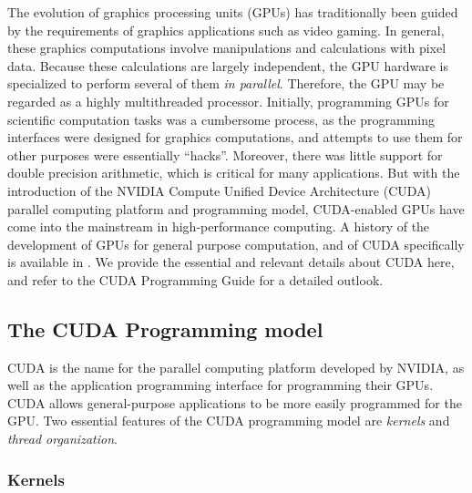 The evolution of graphics processing units (GPUs)
has traditionally been guided by the requirements
of graphics applications such as video gaming.
In general, these graphics computations involve
manipulations and calculations with pixel data.
Because these calculations are largely independent,
the GPU hardware is specialized
to perform several of them \emph{in parallel}.
Therefore, the
GPU may be regarded as a highly multithreaded processor.
Initially,
programming GPUs for scientific computation tasks
was a cumbersome process,
as the programming interfaces were designed for graphics computations,
and attempts to use them for other purposes were essentially ``hacks''.
Moreover, there was little support for double precision arithmetic,
which is critical for many applications.
But with the introduction of the
NVIDIA Compute Unified Device Architecture (CUDA)
parallel computing platform
and programming model,
CUDA-enabled GPUs have come into the
mainstream in high-performance computing.
A history of the development of GPUs
for general purpose computation,
and of CUDA specifically is available
in \cite{HwuBook}.
We provide the essential and relevant details about CUDA here,
and refer to the
CUDA Programming Guide \cite{CUDAProgrammingGuide}
for a detailed outlook.

\subsection{The CUDA Programming model}

CUDA is the name for the parallel computing platform
developed by NVIDIA,
as well as the application programming interface
for programming their GPUs.
CUDA allows general-purpose applications to be
more easily programmed for the GPU.
Two essential features of the CUDA programming model
are \emph{kernels} and \emph{thread organization}.

\subsubsection{Kernels}

